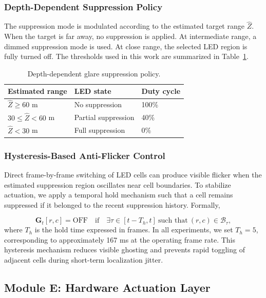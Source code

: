 \documentclass[pdflatex,sn-mathphys-num]{sn-jnl}%
\theoremstyle{thmstyleone}%
\theoremstyle{thmstyletwo}%
\theoremstyle{thmstylethree}%
\begin{document}
\subsubsection{Depth-Dependent Suppression Policy}

The suppression mode is modulated according to the estimated target range $\hat{Z}$. When the target is far away, no suppression is applied. At intermediate range, a dimmed suppression mode is used. At close range, the selected LED region is fully turned off. The thresholds used in this work are summarized in Table~\ref{tab:z_thresh}.

\begin{table}[t]
\centering
\caption{Depth-dependent glare suppression policy.}
\label{tab:z_thresh}
\begin{tabular}{lll}
\hline
\textbf{Estimated range} & \textbf{LED state} & \textbf{Duty cycle} \\
\hline
$\hat{Z} \geq 60$ m & No suppression & 100\% \\
$30 \leq \hat{Z} < 60$ m & Partial suppression & 40\% \\
$\hat{Z} < 30$ m & Full suppression & 0\% \\
\hline
\end{tabular}
\end{table}

\subsubsection{Hysteresis-Based Anti-Flicker Control}

Direct frame-by-frame switching of LED cells can produce visible flicker when the estimated suppression region oscillates near cell boundaries. To stabilize actuation, we apply a temporal hold mechanism such that a cell remains suppressed if it belonged to the recent suppression history. Formally,

\begin{equation}
\mathbf{G}_t[r,c] = \mathrm{OFF}
\quad \text{if} \quad
\exists \tau \in [t-T_h, t] \ \text{such that} \ (r,c) \in \mathcal{B}_{\tau},
\label{eq:hysteresis}
\end{equation}
where $T_h$ is the hold time expressed in frames. In all experiments, we set $T_h = 5$, corresponding to approximately 167 ms at the operating frame rate. This hysteresis mechanism reduces visible ghosting and prevents rapid toggling of adjacent cells during short-term localization jitter.

\subsection{Module E: Hardware Actuation Layer}
\label{subsec:hw}
\end{document}
